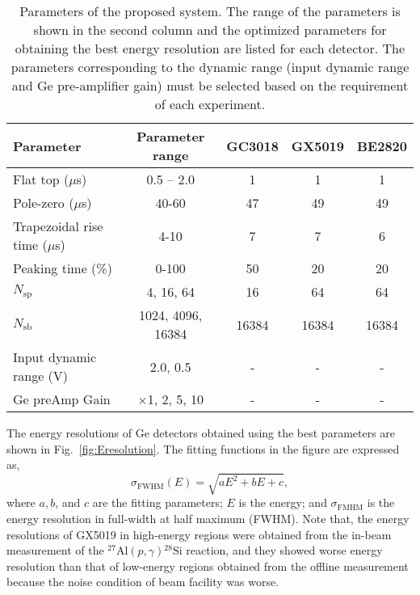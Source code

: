 \begin{table*}[width=.75\textwidth, cols=4,pos=h]
  \caption{Parameters of the proposed system. The range of the parameters is shown in the second column and the optimized parameters for obtaining the best energy resolution are listed for each detector. The parameters corresponding to the dynamic range (input dynamic range and Ge pre-amplifier gain) must be selected based on the requirement of each experiment.}
  \label{tab:Eresolution_parameters}
  \begin{tabular*}{\tblwidth}{@{}lcccc@{}}
\toprule
Parameter       &   Parameter range  & GC3018 & GX5019 & BE2820 \\
\midrule
Flat top ($\mu$s)              &  0.5 -- 2.0      & 1 & 1 & 1 \\
Pole-zero ($\mu$s)             &    40-60         & 47 & 49 & 49 \\
Trapezoidal rise time ($\mu$s) &    4-10          & 7 & 7 & 6 \\
Peaking time (\%)              &   0-100          & 50 & 20 & 20 \\
$N_\mathrm{sp}$                & 4, 16, 64        & 16 & 64 & 64 \\
$N_\mathrm{sb}$                & 1024, 4096, 16384& 16384 & 16384 & 16384 \\
Input dynamic range (V)        &   2.0, 0.5       & - & - & -\\
Ge preAmp Gain                 & $\times$1, 2, 5, 10& - & - & - \\
\bottomrule
  \end{tabular*}
\end{table*}

The energy resolutions of Ge detectors obtained using the best parameters are shown in Fig.~\ref{fig:Eresolution}.
The fitting functions in the figure are expressed as,
\begin{equation}
  \label{eq:Eres_fitting}
  \sigma_\mathrm{FWHM}(E) = \sqrt{aE^2+bE+c},
\end{equation}
where $a, b$, and $c$ are the fitting parameters; $E$ is the energy; and $\sigma_{\mathrm{FMHM}}$ is the energy resolution in full-width at half maximum (FWHM). %
Note that, the energy resolutions of GX5019 in high-energy regions were obtained from the in-beam measurement of the $^{27}\mathrm{Al}(p,\gamma){}^{28}\mathrm{Si}$ reaction, and they showed worse energy resolution than that of low-energy regions obtained from the offline measurement because the noise condition of beam facility was worse.


